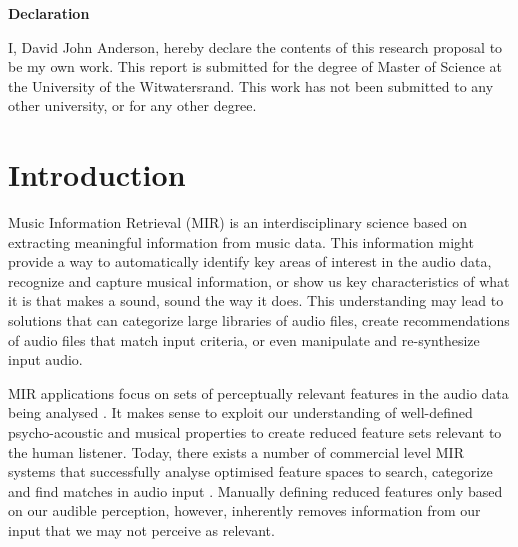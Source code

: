 \documentclass[12pt]{article}
\begin{document}
\newpage

\textbf{\Huge{Declaration}}

\bigskip

I, David John Anderson, hereby declare the contents of this research proposal to be my own work. This report is submitted for the degree of Master of Science at the University of the Witwatersrand. This work has not been submitted to any other university, or for any other degree.

\newpage

\tableofcontents

\newpage
{}

\section{Introduction}

Music Information Retrieval (MIR) is an interdisciplinary science based on extracting meaningful information from music data. This information might provide a way to automatically identify key areas of interest in the audio data, recognize and capture musical information, or show us key characteristics of what it is that makes a sound, sound the way it does. This understanding may lead to solutions that can categorize large libraries of audio files, create recommendations of audio files that match input criteria, or even manipulate and re-synthesize input audio.

MIR applications focus on sets of perceptually relevant features in the audio data being analysed \citep{Lidy05,mirSurvey05}. It makes sense to exploit our understanding of well-defined psycho-acoustic and musical properties to create reduced feature sets relevant to the human listener. Today, there exists a number of commercial level MIR systems that successfully analyse optimised feature spaces to search, categorize and find matches in audio input \citep{mirSurvey05}. Manually defining reduced features only based on our audible perception, however, inherently removes information from our input that we may not perceive as relevant. 
\end{document}
